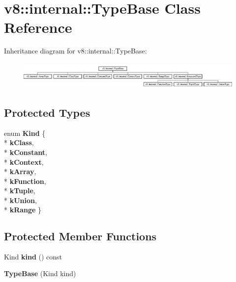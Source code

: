 \hypertarget{classv8_1_1internal_1_1_type_base}{}\section{v8\+:\+:internal\+:\+:Type\+Base Class Reference}
\label{classv8_1_1internal_1_1_type_base}
Inheritance diagram for v8\+:\+:internal\+:\+:Type\+Base\+:\begin{figure}[H]
\begin{center}
\leavevmode
\includegraphics[height=1.403509cm]{classv8_1_1internal_1_1_type_base}
\end{center}
\end{figure}
\subsection*{Protected Types}
\begin{DoxyCompactItemize}
\item 
enum {\bfseries Kind} \{ \\*
{\bfseries k\+Class}, 
\\*
{\bfseries k\+Constant}, 
\\*
{\bfseries k\+Context}, 
\\*
{\bfseries k\+Array}, 
\\*
{\bfseries k\+Function}, 
\\*
{\bfseries k\+Tuple}, 
\\*
{\bfseries k\+Union}, 
\\*
{\bfseries k\+Range}
 \}\hypertarget{classv8_1_1internal_1_1_type_base_a826b73751218d6228c79abdf3983496e}{}\label{classv8_1_1internal_1_1_type_base_a826b73751218d6228c79abdf3983496e}

\end{DoxyCompactItemize}
\subsection*{Protected Member Functions}
\begin{DoxyCompactItemize}
\item 
Kind {\bfseries kind} () const \hypertarget{classv8_1_1internal_1_1_type_base_a9fc412e9cc5f696cd48b0697829b6500}{}\label{classv8_1_1internal_1_1_type_base_a9fc412e9cc5f696cd48b0697829b6500}

\item 
{\bfseries Type\+Base} (Kind kind)\hypertarget{classv8_1_1internal_1_1_type_base_a3a2611cb79094c54e8ccacebfadd6fd6}{}\label{classv8_1_1internal_1_1_type_base_a3a2611cb79094c54e8ccacebfadd6fd6}

\end{DoxyCompactItemize}
